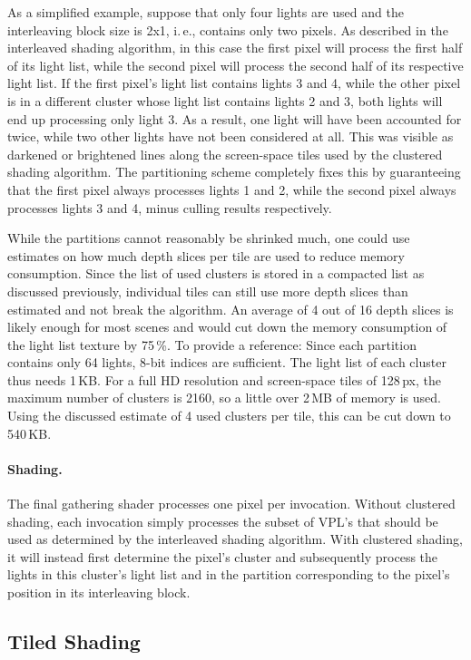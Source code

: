 As a simplified example, suppose that only four lights are used and the interleaving block size is 2x1, i.\,e., contains only two pixels. As described in the interleaved shading algorithm, in this case the first pixel will process the first half of its light list, while the second pixel will process the second half of its respective light list. If the first pixel's light list contains lights 3 and 4, while the other pixel is in a different cluster whose light list contains lights 2 and 3, both lights will end up processing only light 3. As a result, one light will have been accounted for twice, while two other lights have not been considered at all. This was visible as darkened or brightened lines along the screen-space tiles used by the clustered shading algorithm. The partitioning scheme completely fixes this by guaranteeing that the first pixel always processes lights 1 and 2, while the second pixel always processes lights 3 and 4, minus culling results respectively.

While the partitions cannot reasonably be shrinked much, one could use estimates on how much depth slices per tile are used to reduce memory consumption. Since the list of used clusters is stored in a compacted list as discussed previously, individual tiles can still use more depth slices than estimated and not break the algorithm. An average of 4 out of 16 depth slices is likely enough for most scenes and would cut down the memory consumption of the light list texture by 75\,\%. To provide a reference: Since each partition contains only 64 lights, 8-bit indices are sufficient. The light list of each cluster thus needs 1\,KB. For a full HD resolution and screen-space tiles of 128\,px, the maximum number of clusters is 2160, so a little over 2\,MB of memory is used. Using the discussed estimate of 4 used clusters per tile, this can be cut down to 540\,KB.

\paragraph{Shading.}
The final gathering shader processes one pixel per invocation. Without clustered shading, each invocation simply processes the subset of VPL's that should be used as determined by the interleaved shading algorithm. With clustered shading, it will instead first determine the pixel's cluster and subsequently process the lights in this cluster's light list and in the partition corresponding to the pixel's position in its interleaving block.


\subsection{Tiled Shading}

